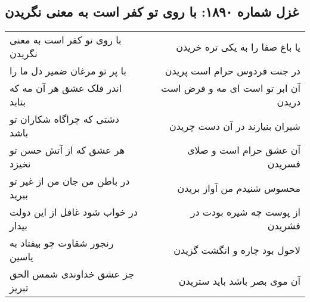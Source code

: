 \begin{center}
\section*{غزل شماره ۱۸۹۰: با روی تو کفر است به معنی نگریدن}
\label{sec:1890}
\begin{longtable}{l p{0.5cm} r}
با روی تو کفر است به معنی نگریدن
&&
یا باغ صفا را به یکی تره خریدن
\\
با پر تو مرغان ضمیر دل ما را
&&
در جنت فردوس حرام است پریدن
\\
اندر فلک عشق هر آن مه که بتابد
&&
آن ابر تو است ای مه و فرض است دریدن
\\
دشتی که چراگاه شکاران تو باشد
&&
شیران بنیارند در آن دست چریدن
\\
هر عشق که از آتش حسن تو نخیزد
&&
آن عشق حرام است و صلای فسریدن
\\
در باطن من جان من از غیر تو ببرید
&&
محسوس شنیدم من آواز بریدن
\\
در خواب شود غافل از این دولت بیدار
&&
از پوست چه شیره بودت در فشریدن
\\
رنجور شقاوت چو بیفتاد به یاسین
&&
لاحول بود چاره و انگشت گزیدن
\\
جز عشق خداوندی شمس الحق تبریز
&&
آن موی بصر باشد باید ستریدن
\\
\end{longtable}
\end{center}
